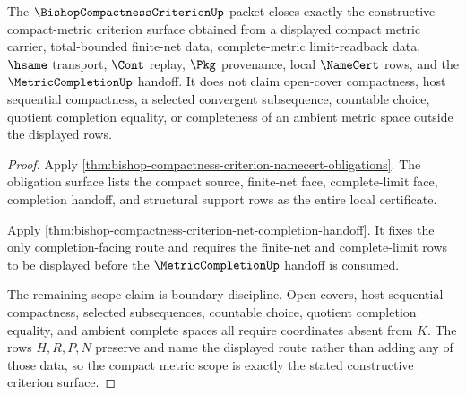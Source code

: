 \begin{theorem}
\label{thm:bishop-compactness-criterion-compact-metric-scope}
The $\BishopCompactnessCriterionUp$ packet closes exactly the constructive compact-metric criterion surface obtained from a displayed compact metric carrier, total-bounded finite-net data, complete-metric limit-readback data, $\hsame$ transport, $\Cont$ replay, $\Pkg$ provenance, local $\NameCert$ rows, and the $\MetricCompletionUp$ handoff. It does not claim open-cover compactness, host sequential compactness, a selected convergent subsequence, countable choice, quotient completion equality, or completeness of an ambient metric space outside the displayed rows.
\end{theorem}
\begin{proof}
Apply \autoref{thm:bishop-compactness-criterion-namecert-obligations}. The obligation surface lists the compact source, finite-net face, complete-limit face, completion handoff, and structural support rows as the entire local certificate.

Apply \autoref{thm:bishop-compactness-criterion-net-completion-handoff}. It fixes the only completion-facing route and requires the finite-net and complete-limit rows to be displayed before the $\MetricCompletionUp$ handoff is consumed.

The remaining scope claim is boundary discipline. Open covers, host sequential compactness, selected subsequences, countable choice, quotient completion equality, and ambient complete spaces all require coordinates absent from $K$. The rows $H,R,P,N$ preserve and name the displayed route rather than adding any of those data, so the compact metric scope is exactly the stated constructive criterion surface.
\end{proof}


